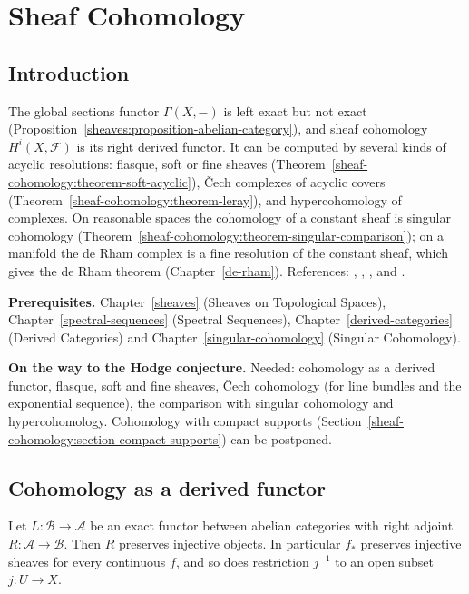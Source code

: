 \chapter{Sheaf Cohomology}\label{sheaf-cohomology}

\section{Introduction}\label{sheaf-cohomology:section-introduction}

The global sections functor $\Gamma(X, -)$ is left exact but not exact (Proposition~\ref{sheaves:proposition-abelian-category}), and
sheaf cohomology $H^i(X, \mathcal{F})$ is its right derived functor. It can be computed by several kinds of acyclic resolutions:
flasque, soft or fine sheaves (Theorem~\ref{sheaf-cohomology:theorem-soft-acyclic}), \v{C}ech complexes of acyclic covers
(Theorem~\ref{sheaf-cohomology:theorem-leray}), and hypercohomology of complexes. On reasonable spaces the cohomology of a constant
sheaf is singular cohomology (Theorem~\ref{sheaf-cohomology:theorem-singular-comparison}); on a manifold the de Rham complex is a fine
resolution of the constant sheaf, which gives the de Rham theorem (Chapter~\ref{de-rham}). References: \cite[Chapter III]{hartshorne-ag},
\cite{godement-faisceaux}, \cite{bredon-sheaf}, \cite{ks-sheaves-manifolds} and \cite[Chapter 4]{voisin-hodge-1}.

\noindent\textbf{Prerequisites.} Chapter~\ref{sheaves} (Sheaves on Topological Spaces), Chapter~\ref{spectral-sequences} (Spectral Sequences),
Chapter~\ref{derived-categories} (Derived Categories) and Chapter~\ref{singular-cohomology} (Singular Cohomology).

\noindent\textbf{On the way to the Hodge conjecture.} Needed: cohomology as a derived functor, flasque, soft and fine sheaves, \v{C}ech cohomology (for line bundles and the exponential
sequence), the comparison with singular cohomology and hypercohomology. Cohomology with compact supports (Section~\ref{sheaf-cohomology:section-compact-supports}) can be postponed.

\section{Cohomology as a derived functor}\label{sheaf-cohomology:section-derived}

\begin{lemma}\label{sheaf-cohomology:lemma-adjoints-injectives}
Let $L \colon \mathcal{B} \to \mathcal{A}$ be an exact functor between abelian categories with right adjoint $R \colon \mathcal{A} \to \mathcal{B}$. Then $R$ preserves injective objects.
In particular $f_*$ preserves injective sheaves for every continuous $f$, and so does restriction $j^{-1}$ to an open subset $j \colon U \to X$.
\end{lemma}

